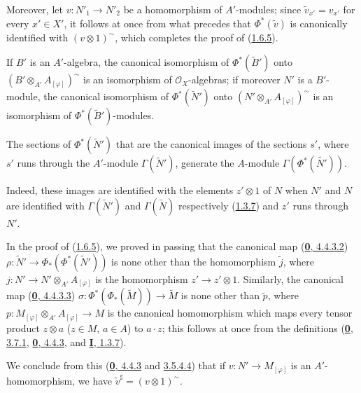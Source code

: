 Moreover, let $v:N'_1\to N'_2$ be a homomorphism of $A'$-modules; since
$\widetilde{v}_{x'}=v_{x'}$ for every $x'\in X'$, it follows at once from
what precedes that $\Phi^*(\widetilde{v})$ is canonically identified with
$(v\otimes 1)^{\sim}$, which completes the proof of
(\hyperref[I.1.6.5]{1.6.5}).

If $B'$ is an $A'$-algebra, the canonical isomorphism of
$\Phi^*(\widetilde{B}')$ onto
$(B'\otimes_{A'}A_{[\varphi]})^{\sim}$ is an isomorphism of
$\mathscr{O}_X$-algebras; if moreover $N'$ is a $B'$-module,
the canonical isomorphism of $\Phi^*(\widetilde{N}')$ onto
$(N'\otimes_{A'}A_{[\varphi]})^{\sim}$ is an isomorphism of
$\Phi^*(\widetilde{B}')$-modules.

\begin{corollary}[1.6.6]
\label{I.1.6.6}
The sections of $\Phi^*(\widetilde{N}')$ that are the canonical images of
the sections $s'$, where $s'$ runs through the $A'$-module
$\Gamma(\widetilde{N}')$, generate the $A$-module
$\Gamma(\Phi^*(\widetilde{N'}))$.
\end{corollary}

Indeed, these images are identified with the elements $z'\otimes 1$ of $N$
when $N'$ and $N$ are identified with $\Gamma(\widetilde{N}')$ and
$\Gamma(\widetilde{N})$ respectively (\hyperref[I.1.3.7]{1.3.7}) and
$z'$ runs through $N'$.

\begin{env}[1.6.7]
\label{I.1.6.7}
In the proof of (\hyperref[I.1.6.5]{1.6.5}), we proved in
passing that the canonical map
(\hyperref[0.4.4.3.2]{\textbf{0}, 4.4.3.2})
$\rho:\widetilde{N}'\to\Phi_*(\Phi^*(\widetilde{N}'))$ is none other than
the homomorphism $\widetilde{j}$,
where $j:N'\to N'\otimes_{A'}A_{[\varphi]}$ is the homomorphism
$z'\to z'\otimes 1$. Similarly, the canonical map
(\hyperref[0.4.4.3.3]{\textbf{0}, 4.4.3.3})
$\sigma:\Phi^*(\Phi_*(\widetilde{M}))\to\widetilde{M}$ is none other than
$\widetilde{p}$, where
$p:M_{[\varphi]}\otimes_{A'}A_{[\varphi]}\to M$ is the canonical
homomorphism which maps every tensor product $z\otimes a$ ($z\in M$,
$a\in A$) to $a\cdot z$; this follows at once from the definitions
(\hyperref[0.3.7.1]{\textbf{0}, 3.7.1},
\hyperref[0.4.4.3]{\textbf{0}, 4.4.3}, and
\hyperref[I.1.3.7]{\textbf{I}, 1.3.7}).

We conclude from this (\hyperref[0.4.4.3]{\textbf{0}, 4.4.3} and
\hyperref[0.3.5.4.4]{3.5.4.4}) that if
$v:N'\to M_{[\varphi]}$ is an $A'$-homomorphism, we have
$\widetilde{v}^{\sharp}=(v\otimes 1)^{\sim}$.
\end{env}

